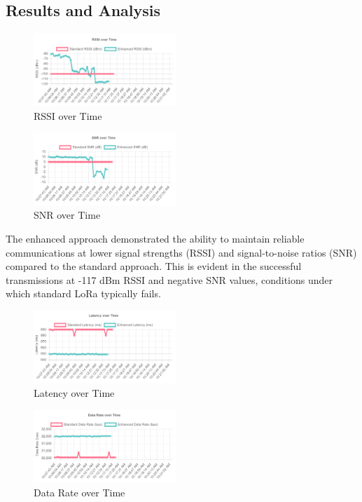 \documentclass[conference]{IEEEtran}
\begin{document}
\subsection{Results and Analysis}

\begin{figure}[htbp]
\centering
\includegraphics[width=0.48\textwidth]{images/rssi-over-time.png}
\caption{RSSI over Time}
\label{fig:rssi_time}
\end{figure}

\begin{figure}[htbp]
\centering
\includegraphics[width=0.48\textwidth]{images/snr-over-time.png}
\caption{SNR over Time}
\label{fig:snr_time}
\end{figure}

The enhanced approach demonstrated the ability to maintain reliable communications at lower signal strengths (RSSI) and signal-to-noise ratios (SNR) compared to the standard approach. This is evident in the successful transmissions at -117 dBm RSSI and negative SNR values, conditions under which standard LoRa typically fails.

\begin{figure}[htbp]
\centering
\includegraphics[width=0.48\textwidth]{images/latency-over-time.png}
\caption{Latency over Time}
\label{fig:latency_time}
\end{figure}

\begin{figure}[htbp]
\centering
\includegraphics[width=0.48\textwidth]{images/data-rate-over-time.png}
\caption{Data Rate over Time}
\label{fig:datarate_time}
\end{figure}
\end{document}
